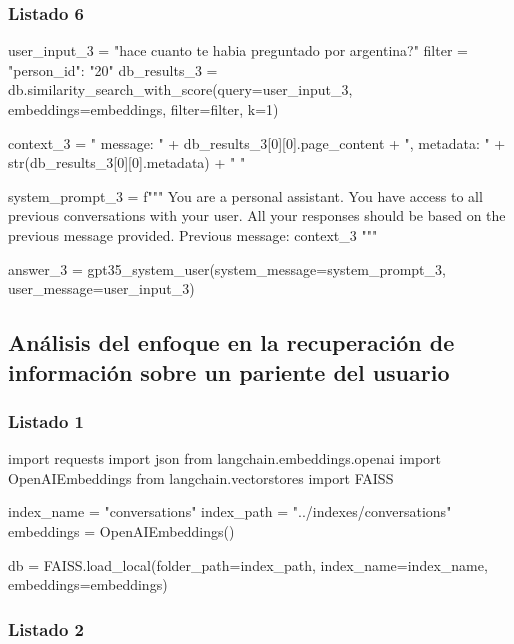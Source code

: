 \subsubsection{Listado 6}
\label{anexo:code-4-1-5-6}

\begin{APACode}
user_input_3 = "hace cuanto te habia preguntado por argentina?"
filter = {"person_id": "20"}
db_results_3 = db.similarity_search_with_score(query=user_input_3, 
                                               embeddings=embeddings, 
                                               filter=filter, k=1)

context_3 = "{ message: " + db_results_3[0][0].page_content + 
            ", metadata: " + str(db_results_3[0][0].metadata) + " }"

system_prompt_3 = f"""
You are a personal assistant.
You have access to all previous conversations with your user.
All your responses should be based on the previous message provided.
Previous message: {context_3}
"""

answer_3 = gpt35_system_user(system_message=system_prompt_3, 
                            user_message=user_input_3)
\end{APACode}

\subsection{Análisis del enfoque en la recuperación de información sobre un pariente del usuario}

\subsubsection{Listado 1}
\label{anexo:code-4-1-6-1}

\begin{APACode}
import requests
import json
from langchain.embeddings.openai import OpenAIEmbeddings
from langchain.vectorstores import FAISS

index_name = "conversations"
index_path = "../indexes/conversations"
embeddings = OpenAIEmbeddings()

db = FAISS.load_local(folder_path=index_path, index_name=index_name, 
                      embeddings=embeddings)
\end{APACode}

\subsubsection{Listado 2}
\label{anexo:code-4-1-6-2}

